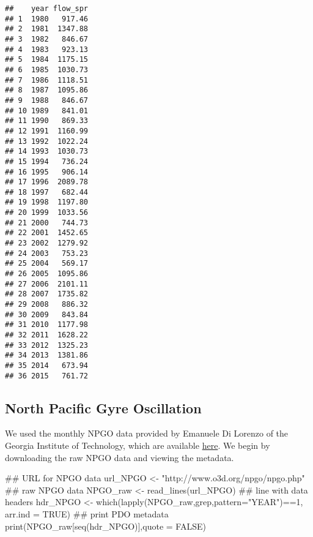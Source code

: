 \documentclass[11pt,]{article}
\newenvironment{Shaded}{}{}
\newcommand{\KeywordTok}[1]{\textcolor[rgb]{0.00,0.00,1.00}{#1}}
\newcommand{\DataTypeTok}[1]{#1}
\newcommand{\DecValTok}[1]{#1}
\newcommand{\StringTok}[1]{\textcolor[rgb]{0.00,0.50,0.50}{#1}}
\newcommand{\OtherTok}[1]{\textcolor[rgb]{1.00,0.25,0.00}{#1}}
\newcommand{\OperatorTok}[1]{#1}
\newcommand{\NormalTok}[1]{#1}
\begin{document}
\begin{verbatim}
##    year flow_spr
## 1  1980   917.46
## 2  1981  1347.88
## 3  1982   846.67
## 4  1983   923.13
## 5  1984  1175.15
## 6  1985  1030.73
## 7  1986  1118.51
## 8  1987  1095.86
## 9  1988   846.67
## 10 1989   841.01
## 11 1990   869.33
## 12 1991  1160.99
## 13 1992  1022.24
## 14 1993  1030.73
## 15 1994   736.24
## 16 1995   906.14
## 17 1996  2089.78
## 18 1997   682.44
## 19 1998  1197.80
## 20 1999  1033.56
## 21 2000   744.73
## 22 2001  1452.65
## 23 2002  1279.92
## 24 2003   753.23
## 25 2004   569.17
## 26 2005  1095.86
## 27 2006  2101.11
## 28 2007  1735.82
## 29 2008   886.32
## 30 2009   843.84
## 31 2010  1177.98
## 32 2011  1628.22
## 33 2012  1325.23
## 34 2013  1381.86
## 35 2014   673.94
## 36 2015   761.72
\end{verbatim}

\subsection{North Pacific Gyre
Oscillation}\label{north-pacific-gyre-oscillation}

We used the monthly NPGO data provided by Emanuele Di Lorenzo of the
Georgia Institute of Technology, which are available
\href{http://www.o3d.org/npgo/npgo.php}{here}. We begin by downloading
the raw NPGO data and viewing the metadata.

\begin{Shaded}
\begin{Highlighting}[]
\NormalTok{## URL for NPGO data}
\NormalTok{url_NPGO <-}\StringTok{ "http://www.o3d.org/npgo/npgo.php"}
\NormalTok{## raw NPGO data }
\NormalTok{NPGO_raw <-}\StringTok{ }\KeywordTok{read_lines}\NormalTok{(url_NPGO)}
\NormalTok{## line with data headers}
\NormalTok{hdr_NPGO <-}\StringTok{ }\KeywordTok{which}\NormalTok{(}\KeywordTok{lapply}\NormalTok{(NPGO_raw,grep,}\DataTypeTok{pattern=}\StringTok{"YEAR"}\NormalTok{)}\OperatorTok{==}\DecValTok{1}\NormalTok{, }\DataTypeTok{arr.ind =} \OtherTok{TRUE}\NormalTok{)}
\NormalTok{## print PDO metadata}
\KeywordTok{print}\NormalTok{(NPGO_raw[}\KeywordTok{seq}\NormalTok{(hdr_NPGO)],}\DataTypeTok{quote =} \OtherTok{FALSE}\NormalTok{)}
\end{Highlighting}
\end{Shaded}
\end{document}
